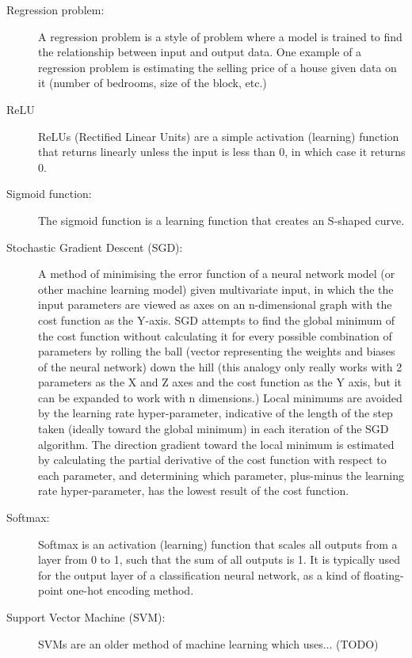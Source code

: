 \documentclass[]{report}
\begin{document}
\begin{description}
\item[Regression problem:] A regression problem is a style of problem where a model is trained to find the relationship between input and output data. One example of a regression problem is estimating the selling price of a house given data on it (number of bedrooms, size of the block, etc.)	

\item[ReLU] ReLUs (Rectified Linear Units) are a simple activation (learning) function that returns linearly unless the input is less than 0, in which case it returns 0.

\item[Sigmoid function:] The sigmoid function is a learning function that creates an S-shaped curve.

\label{itm:SGD}
\item[Stochastic Gradient Descent (SGD):] A method of minimising the error function of a neural network model (or other machine learning model) given multivariate input, in which the the input parameters are viewed as axes on an n-dimensional graph with the cost function as the Y-axis. SGD attempts to find the global minimum of the cost function without calculating it for every possible combination of parameters by rolling the ball (vector representing the weights and biases of the neural network) down the hill (this analogy only really works with 2 parameters as the X and Z axes and the cost function as the Y axis, but it can be expanded to work with n dimensions.) Local minimums are avoided by the learning rate hyper-parameter, indicative of the length of the step taken (ideally toward the global minimum) in each iteration of the SGD algorithm. The direction gradient toward the local minimum is estimated by calculating the partial derivative of the cost function with respect to each parameter, and determining which parameter, plus-minus the learning rate hyper-parameter, has the lowest result of the cost function.

\item[Softmax:] Softmax is an activation (learning) function that scales all outputs from a layer from 0 to 1, such that the sum of all outputs is 1. It is typically used for the output layer of a classification neural network, as a kind of floating-point one-hot encoding method.

\item[Support Vector Machine (SVM):] SVMs are an older method of machine learning which uses... (TODO)
\end{description}
\onecolumn

\printbibliography
\end{document}
